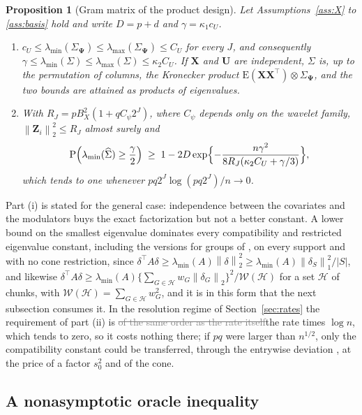 \documentclass[12pt]{article} %
\newtheorem{proposition}{Proposition}
\theoremstyle{definition}
\theoremstyle{plain}
\newcommand{\E}{\mathrm{E}}
\newcommand{\Prob}{\mathrm{P}}
\newcommand{\T}{^{\top}}
\newcommand{\norm}[1]{\left\lVert #1 \right\rVert}
\newcommand{\bX}{\mathbf{X}}
\newcommand{\bU}{\mathbf{U}}
\newcommand{\bZ}{\mathbf{Z}}
\newcommand{\Gram}{\Sigma}
\newcommand{\Gramhat}{\widehat{\Sigma}}
\newcommand{\bPsi}{\boldsymbol{\Psi}}
\newcommand{\lmin}{\lambda_{\min}}
\newcommand{\lmaxx}{\lambda_{\max}}
\newcommand{\Hcal}{\mathcal{H}}
\newcommand{\Wcal}{\mathcal{W}}
\begin{document}
\begin{proposition}[Gram matrix of the product design]
\label{prop:gram}
Let Assumptions~\ref{ass:X} to \ref{ass:basis} hold and write $D = p + d$ and
$\gamma = \kappa_1 c_U$.
\begin{enumerate}
\item[(i)] $c_U \le \lmin(\Gram_{\bPsi}) \le \lmaxx(\Gram_{\bPsi}) \le C_U$
for every $J$, and consequently
$\gamma \le \lmin(\Gram) \le \lmaxx(\Gram) \le \kappa_2 C_U$. If $\bX$ and
$\bU$ are independent, $\Gram$ is, up to the permutation of columns, the
Kronecker product $\E(\bX\bX\T)\otimes\Gram_{\bPsi}$, and the two bounds are
attained as products of eigenvalues.
\item[(ii)] With $R_J = pB_X^{2}(1 + qC_\psi 2^{J})$, where $C_\psi$ depends
only on the wavelet family, $\norm{\bZ_i}_2^{2} \le R_J$ almost surely and
\[
  \Prob\Bigl(\lmin(\Gramhat) \ge \frac{\gamma}{2}\Bigr)
  \;\ge\; 1 - 2D\exp\Bigl\{-\frac{n\gamma^{2}}
  {8R_J(\kappa_2C_U + \gamma/3)}\Bigr\},
\]
which tends to one whenever $pq2^{J}\log(pq2^{J})/n \to 0$.
\end{enumerate}
\end{proposition}

Part (i) is stated for the general case: independence between the covariates
and the modulators buys the exact factorization but not a better constant. A
lower bound on the smallest eigenvalue dominates every compatibility and
restricted eigenvalue constant\textcolor{colR1}{, including the versions for groups
of \citet{Lounici-Pontil-vandeGeer-Tsybakov-2011}}, on every support and with no cone restriction,
since $\delta\T A \delta \ge \lmin(A)\norm{\delta}_2^2 \ge
\lmin(A)\norm{\delta_S}_1^2/|S|$\textcolor{colR1}{, and likewise
$\delta\T A\delta \ge \lmin(A)\{\sum_{G\in\Hcal}w_{G}\norm{\delta_{G}}_{2}\}^{2}/\Wcal(\Hcal)$
for a set $\Hcal$ of chunks, with $\Wcal(\Hcal) = \sum_{G\in\Hcal}w_{G}^{2}$},
and it is in this form that the next
subsection consumes it. In the resolution regime of Section~\ref{sec:rates}
the requirement of part (ii) is \textcolor{gray}{\sout{of the same order as the rate itself}}\textcolor{colR1}{the
rate times $\log n$, which tends to zero}, so it
costs nothing there; if $pq$ were larger than $n^{1/2}$, only the
compatibility constant could be transferred, through the entrywise deviation
\citep[Corollary 6.8]{buhlmann2011statistics}, at the price of a factor
$s_0^{2}$ and of the cone.

\subsection{A nonasymptotic oracle inequality}
\label{sec:oracle}
\end{document}

